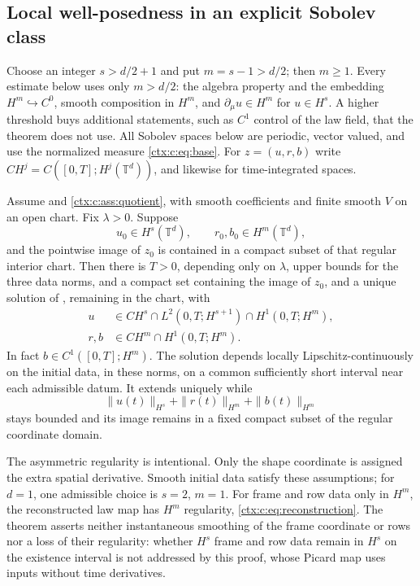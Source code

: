 \subsection{Local well-posedness in an explicit Sobolev class}

Choose an integer $s>d/2+1$ and put $m=s-1>d/2$; then $m\geq1$. Every estimate below uses only $m>d/2$: the algebra property and the embedding $H^m\hookrightarrow C^0$, smooth composition in $H^m$, and $\partial_\mu u\in H^m$ for $u\in H^s$. A higher threshold buys additional statements, such as $C^1$ control of the law field, that the theorem does not use. All Sobolev spaces below are periodic, vector valued, and use the normalized measure \cref{ctx:c:eq:base}. For $z=(u,r,b)$ write $CH^j=C([0,T];H^j(\mathbb T^d))$, and likewise for time-integrated spaces.

Assume  and \cref{ctx:c:ass:quotient}, with smooth coefficients and finite smooth $V$ on an open chart. Fix $\lambda>0$. Suppose
\begin{equation}
 u_0\in H^s(\mathbb T^d),\qquad r_0,b_0\in H^m(\mathbb T^d),
 \label{ctx:c:eq:initial}
\end{equation}
and the pointwise image of $z_0$ is contained in a compact subset of that regular interior chart. Then there is $T>0$, depending only on $\lambda$, upper bounds for the three data norms, and a compact set containing the image of $z_0$, and a unique solution of , remaining in the chart, with
\begin{align}
 u&\in CH^s\cap L^2(0,T;H^{s+1})\cap H^1(0,T;H^m),\label{ctx:c:eq:ureg}\\
 r,b&\in CH^m\cap H^1(0,T;H^m).\label{ctx:c:eq:rbreg}
\end{align}
In fact $b\in C^1([0,T];H^m)$. The solution depends locally Lipschitz-continuously on the initial data, in these norms, on a common sufficiently short interval near each admissible datum. It extends uniquely while
\begin{equation}
 \|u(t)\|_{H^s}+\|r(t)\|_{H^m}+\|b(t)\|_{H^m}
 \label{ctx:c:eq:continuation}
\end{equation}
stays bounded and its image remains in a fixed compact subset of the regular coordinate domain.


The asymmetric regularity is intentional. Only the shape coordinate is assigned the extra spatial derivative. Smooth initial data satisfy these assumptions; for $d=1$, one admissible choice is $s=2$, $m=1$. For frame and row data only in $H^m$, the reconstructed law map has $H^m$ regularity, \cref{ctx:c:eq:reconstruction}. The theorem asserts neither instantaneous smoothing of the frame coordinate or rows nor a loss of their regularity: whether $H^s$ frame and row data remain in $H^s$ on the existence interval is not addressed by this proof, whose Picard map uses inputs without time derivatives.

